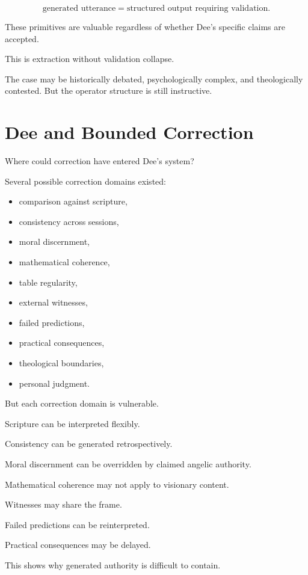 \documentclass[11pt]{book}
\begin{document}
\[
\text{generated utterance} = \text{structured output requiring validation}.
\]

These primitives are valuable regardless of whether Dee's specific claims are accepted.

This is extraction without validation collapse.

The case may be historically debated, psychologically complex, and theologically contested. But the operator structure is still instructive.

\section{Dee and Bounded Correction}

Where could correction have entered Dee's system?

Several possible correction domains existed:

\begin{itemize}
    \item comparison against scripture,
    \item consistency across sessions,
    \item moral discernment,
    \item mathematical coherence,
    \item table regularity,
    \item external witnesses,
    \item failed predictions,
    \item practical consequences,
    \item theological boundaries,
    \item personal judgment.
\end{itemize}

But each correction domain is vulnerable.

Scripture can be interpreted flexibly.

Consistency can be generated retrospectively.

Moral discernment can be overridden by claimed angelic authority.

Mathematical coherence may not apply to visionary content.

Witnesses may share the frame.

Failed predictions can be reinterpreted.

Practical consequences may be delayed.

This shows why generated authority is difficult to contain.
\end{document}
